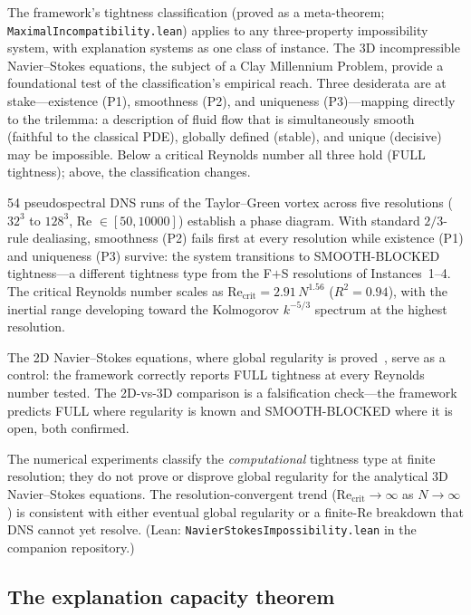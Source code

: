 \documentclass[11pt]{article}
\begin{document}
The framework's tightness classification (proved as a meta-theorem;
\texttt{MaximalIncompatibility.lean}) applies to any three-property
impossibility system, with explanation systems as one class of instance.
The 3D incompressible Navier--Stokes equations, the subject of a Clay
Millennium Problem, provide a foundational test of the classification's
empirical reach.  Three desiderata are at stake---existence (P1), smoothness (P2), and
uniqueness (P3)---mapping directly to the trilemma: a description of
fluid flow that is simultaneously smooth (faithful to the classical PDE),
globally defined (stable), and unique (decisive) may be impossible.  Below a critical Reynolds
number all three hold (FULL tightness); above, the classification changes.

54 pseudospectral DNS runs of the Taylor--Green vortex across five
resolutions ($32^3$ to $128^3$, Re $\in [50, 10000]$) establish a phase
diagram.  With standard $2/3$-rule dealiasing, smoothness (P2) fails first
at every resolution while existence (P1) and uniqueness (P3) survive: the
system transitions to SMOOTH-BLOCKED tightness---a different tightness type
from the F$+$S resolutions of Instances~1--4.  The critical Reynolds number
scales as $\mathrm{Re}_{\mathrm{crit}} = 2.91\,N^{1.56}$ ($R^2 = 0.94$),
with the inertial range developing toward the Kolmogorov $k^{-5/3}$ spectrum
at the highest resolution.

The 2D Navier--Stokes equations, where global regularity is
proved~\citep{ladyzhenskaya1969mathematical}, serve as a control: the
framework correctly reports FULL tightness at every Reynolds number tested.
The 2D-vs-3D comparison is a falsification check---the framework predicts
FULL where regularity is known and SMOOTH-BLOCKED where it is open, both
confirmed.

The numerical experiments classify the \emph{computational} tightness type
at finite resolution; they do not prove or disprove global regularity for
the analytical 3D Navier--Stokes equations.  The resolution-convergent trend
($\mathrm{Re}_{\mathrm{crit}} \to \infty$ as $N \to \infty$) is consistent
with either eventual global regularity or a finite-Re breakdown that DNS
cannot yet resolve.  (Lean: \texttt{NavierStokesImpossibility.lean} in
the companion repository.)

\subsection*{The explanation capacity theorem}
\end{document}
